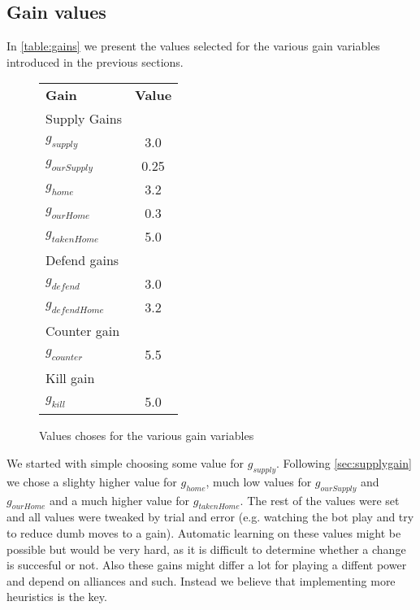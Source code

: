 \documentclass[a4paper]{article} %
\begin{document}
\subsection{Gain values}

In \autoref{table:gains} we present the values selected for the various gain variables introduced in the previous sections. 

\begin{figure}[H]
\centering
\begin{tabular}{| l | c |}
  \hline            
  {\bf Gain} & {\bf Value}\\
  {Supply Gains} &  \\
  $g_{supply}$ & 3.0 \\
  $g_{ourSupply}$ & 0.25 \\
  $g_{home}$ & 3.2 \\
  $g_{ourHome}$ & 0.3 \\
  $g_{takenHome}$ & 5.0 \\
  {Defend gains} &  \\
  $g_{defend}$ &  3.0 \\
  $g_{defendHome}$ & 3.2 \\
  {Counter gain} & \\
  $g_{counter}$ & 5.5 \\
  {Kill gain} & \\
  $g_{kill}$ & 5.0 \\
  \hline  
\end{tabular}
\caption{Values choses for the various gain variables}
\label{table:gains}
\end{figure}

We started with simple choosing some value for $g_{supply}$. Following \autoref{sec:supplygain} we chose a slighty higher value for $g_{home}$, much low values for $g_{ourSupply}$ and $g_{ourHome}$ and a much higher value for $g_{takenHome}$. The rest of the values were set and all values were tweaked by trial and error (e.g. watching the bot play and try to reduce dumb moves to a gain). Automatic learning on these values might be possible but would be very hard, as it is difficult to determine whether a change is succesful or not. Also these gains might differ a lot for playing a diffent power and depend on alliances and such. Instead we believe that implementing more heuristics is the key. 
\end{document}
